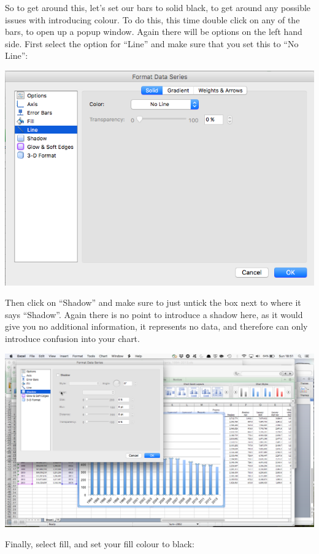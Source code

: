 \documentclass[
]{book}
\begin{document}
So to get around this, let's set our bars to solid black, to get around any possible issues with introducing colour. To do this, this time double click on any of the bars, to open up a popup window. Again there will be options on the left hand side. First select the option for ``Line'' and make sure that you set this to ``No Line'':

\includegraphics{imgs/desc_viz_11.png}

Then click on ``Shadow'' and make sure to just untick the box next to where it says ``Shadow''. Again there is no point to introduce a shadow here, as it would give you no additional information, it represents no data, and therefore can only introduce confusion into your chart.

\includegraphics{imgs/desc_viz_12.png}

Finally, select fill, and set your fill colour to black:
\end{document}
